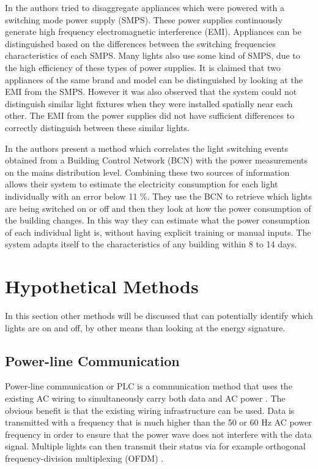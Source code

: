 		In \cite{Gupta:2010} the authors tried to disaggregate appliances which were powered with a switching mode power supply (SMPS).
		These power supplies continuously generate high frequency electromagnetic interference (EMI).
		Appliances can be distinguished based on the differences between the switching frequencies characteristics of each SMPS.
		Many lights also use some kind of SMPS, due to the high efficiency of these types of power supplies.
		It is claimed that two appliances of the same brand and model can be distinguished by looking at the EMI from the SMPS.
		However it was also observed that the system could not distinguish similar light fixtures when they were installed spatially near each other.
		The EMI from the power supplies did not have sufficient differences to correctly distinguish between these similar lights. 


		In \cite{Englert:2016:LAE:2893711.2893724} the authors present a method which correlates the light switching events obtained from a Building Control Network (BCN) with the power measurements on the mains distribution level.
		Combining these two sources of information allows their system to estimate the electricity consumption for each light individually with an error below 11 \%.
		They use the BCN to retrieve which lights are being switched on or off and then they look at how the power consumption of the building changes.
		In this way they can estimate what the power consumption of each individual light is, without having explicit training or manual inputs.
		The system adapts itself to the characteristics of any building within 8 to 14 days.



		

	\section{Hypothetical Methods}

		In this section other methods will be discussed that can potentially identify which lights are on and off, by other means than looking at the energy signature.




		\subsection{Power-line Communication}

		Power-line communication or PLC is a communication method that uses the existing AC wiring to simultaneously carry both data and AC power \cite{1205458}.
		The obvious benefit is that the existing wiring infrastructure can be used.
		Data is transmitted with a frequency that is much higher than the 50 or 60 Hz AC power frequency in order to ensure that the power wave does not interfere with the data signal.
		Multiple lights can then transmit their status via for example orthogonal frequency-division multiplexing (OFDM) \cite{hoch2011comparison}.




